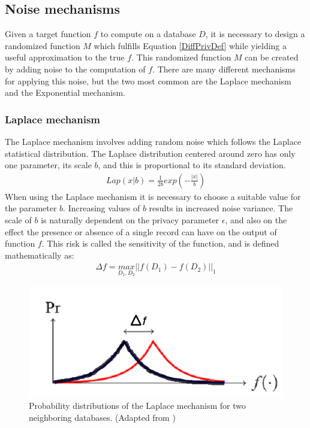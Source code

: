 \subsection{Noise mechanisms}
Given a target function $f$ to compute on a database $D$, it is necessary to design a randomized function $M$ which fulfills Equation \ref{DiffPrivDef} while yielding a useful approximation to the true $f$. This randomized function $M$ can be created by adding noise to the computation of $f$. There are many different mechanisms for applying this noise, but the two most common are the Laplace mechanism and the Exponential mechanism. 

\subsubsection{Laplace mechanism}
The Laplace mechanism involves adding random noise which follows the Laplace statistical distribution. The Laplace distribution centered around zero has only one parameter, its scale $b$, and this is proportional to its standard deviation. 
\begin{eqnarray} \label{LaplaceDisDef}
Lap(x|b) = \frac{1}{2b} exp (-\frac{|x|}{b})
\end{eqnarray}
When using the Laplace mechanism it is necessary to choose a suitable value for the parameter $b$. Increasing values of $b$ results in increased noise variance. The scale of $b$ is naturally dependent on the privacy parameter $\epsilon$, and also on the effect the presence or absence of a single record can have on the output of function $f$. This risk is called the sensitivity of the function, and is defined mathematically as:
\begin{eqnarray} \label{eq:sensitivity_def}
\Delta f=\underset{D_1,D_2}{max}||\mathit{f(D_1)}-\mathit{f(D_2)}||_{1}
 \end{eqnarray}
\begin{figure}[H]
	\centering
	\includegraphics[width=\textwidth]{fig/laplace}
	\caption{Probability distributions of the Laplace mechanism for two neighboring databases. (Adapted from \citep{hsu2014economicEpsilon})}
	\label{fig:laplace_distribution}
\end{figure}
